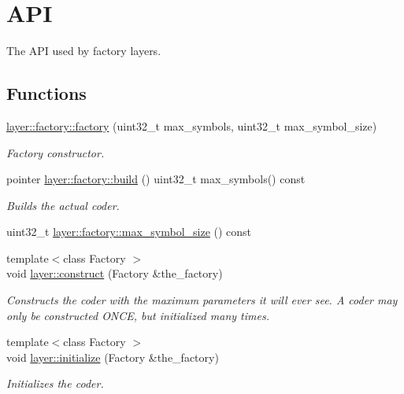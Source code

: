 \hypertarget{group__factory__api}{\section{A\-P\-I}
\label{group__factory__api}
}


The A\-P\-I used by factory layers.  


\subsection*{Functions}
\begin{DoxyCompactItemize}
\item 
\hyperlink{group__factory__api_gadc3f7a87a26d462894f5ddc8cc0a75ab}{layer\-::factory\-::factory} (uint32\-\_\-t max\-\_\-symbols, uint32\-\_\-t max\-\_\-symbol\-\_\-size)
\begin{DoxyCompactList}\small\item\em Factory constructor. \end{DoxyCompactList}\item 
pointer \hyperlink{group__factory__api_ga8ea258f22d2d2b7ae84b7ceb87559d43}{layer\-::factory\-::build} () uint32\-\_\-t max\-\_\-symbols() const 
\begin{DoxyCompactList}\small\item\em Builds the actual coder. \end{DoxyCompactList}\item 
uint32\-\_\-t \hyperlink{group__factory__api_ga23197967df1fb32d3b6102448194426b}{layer\-::factory\-::max\-\_\-symbol\-\_\-size} () const 
\item 
{\footnotesize template$<$class Factory $>$ }\\void \hyperlink{group__factory__api_ga770d14a82969fcb6c9b0ecbf0525a0ca}{layer\-::construct} (Factory \&the\-\_\-factory)
\begin{DoxyCompactList}\small\item\em Constructs the coder with the maximum parameters it will ever see. A coder may only be constructed O\-N\-C\-E, but initialized many times. \end{DoxyCompactList}\item 
{\footnotesize template$<$class Factory $>$ }\\void \hyperlink{group__factory__api_ga04e884873c981167ed98dd8a3d28f426}{layer\-::initialize} (Factory \&the\-\_\-factory)
\begin{DoxyCompactList}\small\item\em Initializes the coder. \end{DoxyCompactList}\end{DoxyCompactItemize}


